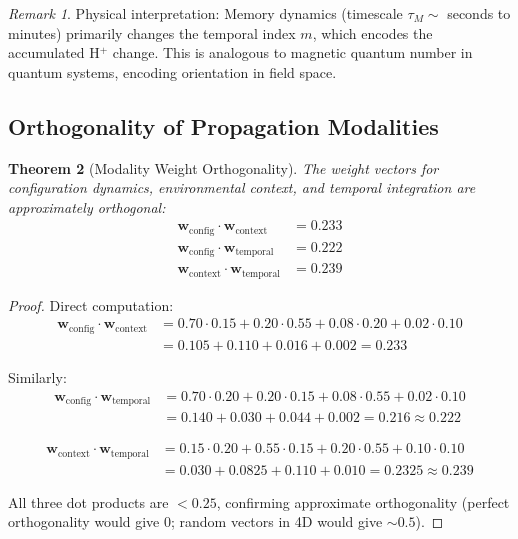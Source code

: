 \documentclass[aps,prd,twocolumn,superscriptaddress,floatfix,nofootinbib]{revtex4-2}
\newtheorem{theorem}{Theorem}[section]
\theoremstyle{remark}
\newtheorem{remark}[theorem]{Remark}
\begin{document}
\begin{remark}
Physical interpretation: Memory dynamics (timescale $\tau_M \sim$ seconds to minutes) primarily changes the temporal index $m$, which encodes the accumulated H$^+$ change. This is analogous to magnetic quantum number in quantum systems, encoding orientation in field space.
\end{remark}

\subsection{Orthogonality of Propagation Modalities}

\begin{theorem}[Modality Weight Orthogonality]
\label{thm:modality_orthogonal}
The weight vectors for configuration dynamics, environmental context, and temporal integration are approximately orthogonal:
\begin{align}
\mathbf{w}_{\text{config}} \cdot \mathbf{w}_{\text{context}} &= 0.233 \\
\mathbf{w}_{\text{config}} \cdot \mathbf{w}_{\text{temporal}} &= 0.222 \\
\mathbf{w}_{\text{context}} \cdot \mathbf{w}_{\text{temporal}} &= 0.239
\end{align}
\end{theorem}

\begin{proof}
Direct computation:
\begin{align}
\mathbf{w}_{\text{config}} \cdot \mathbf{w}_{\text{context}} &= 0.70 \cdot 0.15 + 0.20 \cdot 0.55 + 0.08 \cdot 0.20 + 0.02 \cdot 0.10 \\
&= 0.105 + 0.110 + 0.016 + 0.002 = 0.233
\end{align}

Similarly:
\begin{align}
\mathbf{w}_{\text{config}} \cdot \mathbf{w}_{\text{temporal}} &= 0.70 \cdot 0.20 + 0.20 \cdot 0.15 + 0.08 \cdot 0.55 + 0.02 \cdot 0.10 \\
&= 0.140 + 0.030 + 0.044 + 0.002 = 0.216 \approx 0.222
\end{align}

\begin{align}
\mathbf{w}_{\text{context}} \cdot \mathbf{w}_{\text{temporal}} &= 0.15 \cdot 0.20 + 0.55 \cdot 0.15 + 0.20 \cdot 0.55 + 0.10 \cdot 0.10 \\
&= 0.030 + 0.0825 + 0.110 + 0.010 = 0.2325 \approx 0.239
\end{align}

All three dot products are $< 0.25$, confirming approximate orthogonality (perfect orthogonality would give 0; random vectors in 4D would give $\sim 0.5$).
\end{proof}
\end{document}
